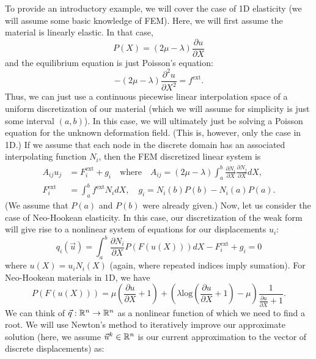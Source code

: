 To provide an introductory example, we will cover the case of 1D elasticity (we will assume some basic knowledge of FEM). Here, we will first assume the material is linearly elastic. In that case,
\begin{equation*}
P(X) = \left( 2 \mu - \lambda \right) \frac{\partial u}{\partial X}
\end{equation*}
and the equilibrium equation is just Poisson's equation:
\begin{equation*}
-\left( 2 \mu - \lambda \right) \frac{\partial^2 u}{\partial X^2} = f^{\text{ext}}.
\end{equation*}
Thus, we can just use a continuous piecewise linear interpolation space of a uniform discretization of our material (which we will assume for simplicity is just some interval $(a,b)$). In this case, we will ultimately just be solving a Poisson equation for the unknown deformation field. (This is, however, only the case in 1D.) If we assume that each node in the discrete domain has an associated interpolating function $N_i$, then the FEM discretized linear system is
\begin{align*}
A_{ij} u_j & = F^{\text{ext}}_i + g_i \quad \text{where} \quad A_{ij} = \left( 2 \mu - \lambda \right) \int_a^b \frac{\partial N_i}{\partial X}\frac{\partial N_j}{\partial X} dX, \\
F^{\text{ext}}_i & = \int_a^b f^{\text{ext}} N_i dX, \quad g_i = N_i(b) P(b) - N_i(a) P(a).
\end{align*}
(We assume that $P(a)$ and $P(b)$ were already given.) Now, let us consider the case of Neo-Hookean elasticity. In this case, our discretization of the weak form will give rise to a nonlinear system of equations for our displacements $u_i$:
\begin{equation*}
q_i \left( \vec{u} \right) = \int_a^b \frac{\partial N_i}{\partial X} P(F(u(X))) dX - F^{\text{ext}}_i + g_i = 0
\end{equation*}
where $u(X) = u_i N_i(X)$ (again, where repeated indices imply sumation). For Neo-Hookean materials in 1D, we have
\begin{equation*}
P(F(u(X))) = \mu \left( \frac{\partial u}{\partial X} + 1 \right) + \left( \lambda \text{log} \left( \frac{\partial u}{\partial X} + 1 \right) - \mu \right) \frac{1}{\frac{\partial u}{\partial X} + 1}.
\end{equation*}
We can think of $\vec{q} : \mathbb{R}^n \to \mathbb{R}^n$ as a nonlinear function of which we need to find a root. We will use Newton's method to iteratively improve our approximate solution (here, we assume $\vec{u}^k \in \mathbb{R}^n$ is our current approximation to the vector of discrete displacements) as:
